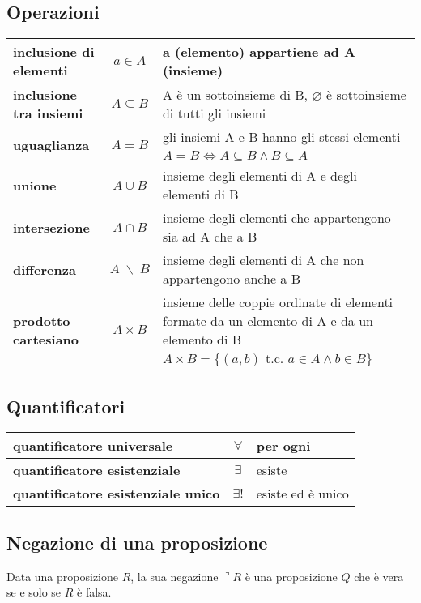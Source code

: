 \documentclass[a4paper]{article}
\begin{document}
\subsection{Operazioni}
\begin{center}
	\begin{tabularx}{\textwidth}{l c X}
		\textbf{inclusione di elementi} & \(a \in A\) & a (elemento) appartiene ad A (insieme) \\
		\midrule
		\textbf{inclusione tra insiemi} & \(A \subseteq B\) & A è un sottoinsieme di B, \(\varnothing\) è sottoinsieme di tutti gli insiemi \\
		\midrule
		\multirow{2}{*}{\textbf{uguaglianza}} & \multirow{2}{*}{\(A = B\)} & gli insiemi A e B hanno gli stessi elementi \\
		& & \(A = B \Leftrightarrow A \subseteq B \land B \subseteq A\) \\
		\midrule
		\textbf{unione} & \(A \cup B\) & insieme degli elementi di A e degli elementi di B \\
		\midrule
		\textbf{intersezione} & \(A \cap B\) & insieme degli elementi che appartengono sia ad A che a B \\
		\midrule
		\textbf{differenza} & \(A \; \backslash \; B\) & insieme degli elementi di A che non appartengono anche a B \\
		\midrule
		\multirow{2}{*}{\textbf{prodotto cartesiano}} & \multirow{2}{*}{\(A \times B\)} & insieme delle coppie ordinate di elementi formate da un elemento di A e da un elemento di B \\
		& & \(A \times B = \{ (a, b) \text{ t.c. } a \in A \land b \in B \}\)
	\end{tabularx}
\end{center}


\subsection{Quantificatori}
\begin{center}
	\begin{tabular}{l c l}
		\textbf{quantificatore universale} & \(\forall\) & per ogni \\
		\midrule
		\textbf{quantificatore esistenziale} & \(\exists\) & esiste \\
		\midrule
		\textbf{quantificatore esistenziale unico} & \(\exists!\) & esiste ed è unico
	\end{tabular}
\end{center}


\subsection{Negazione di una proposizione}
Data una proposizione \(R\), la sua negazione \(\urcorner R\) è una proposizione \(Q\) che è vera se e solo se \(R\) è falsa.
\end{document}
